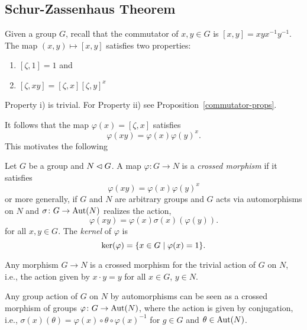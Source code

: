\begin{solution}
\section{Schur-Zassenhaus Theorem}\label{schur-zassenhaus}

Given a group $G$, recall that the commutator of $x,y\in G$ is $[x,y]=xyx^{-1}y^{-1}$. The map $(x,y)\mapsto[x,y]$ satisfies two properties:
\begin{enumerate}[\rm i)]
    \item $[\zeta,1]=1$ and
    \item $[\zeta,xy]=[\zeta,x][\zeta,y]^x$
\end{enumerate}
Property i) is trivial. For Property ii) see Proposition~\ref{commutator-props}.

It follows that the map $\varphi(x)=[\zeta,x]$ satisfies
$$
    \varphi(xy) = \varphi(x)\varphi(y)^x.
$$
This motivates the following

\begin{defn}\label{def:crossed-morphism}
    Let\/ $G$ be a group and\/ $N\lhd G$. A map\/ $\varphi\colon G\to N$ is a \textsl{crossed morphism} if it satisfies
    $$
        \varphi(xy)=\varphi(x)\varphi(y)^x
    $$
    or more generally, if\/ $G$ and\/ $N$ are arbitrary groups and\/ $G$ acts via automorphisms on\/ $N$ and $\sigma\colon G\to{\rm Aut}(N)$ realizes the action,
    $$
        \varphi(xy)=\varphi(x)\sigma(x)(\varphi(y)).
    $$
    for all\/ $x,y\in G$.
    The \textsl{kernel} of\/ $\varphi$ is
    $$
        \ker(\varphi)=\{x\in G\mid\varphi(x)=1\}.
    $$
\end{defn}

\begin{rem}
    Any morphism\/ $G\to N$ is a crossed morphism for the trivial action of\/ $G$ on\/ $N$, i.e., the action given by\/ $x\cdot y=y$ for all\/ $x\in G$, $y\in N$.
\end{rem}

\begin{prop}
    Any group action of\/ $G$ on\/ $N$ by automorphisms can be seen as a crossed morphism of groups\/ $\varphi\colon G\to{\rm Aut}(N)$, where the action is given by conjugation, i.e., $\sigma(x)(\theta)=\varphi(x)\circ\theta\circ\varphi(x)^{-1}$ for\/ $g\in G$ and\/ $\theta\in{\rm Aut}(N)$.
\end{prop}


\end{solution}
